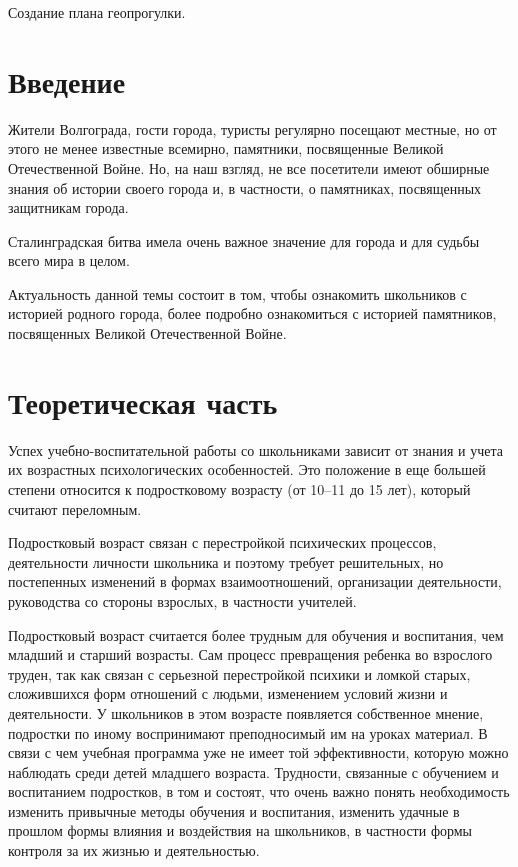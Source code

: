 \newcommand{\eX}{\stepcounter{theX}X\arabic{theX}}

\begin{center}
  \large Создание плана геопрогулки.
\end{center}

\section*{Введение}

Жители Волгограда, гости города, туристы регулярно посещают местные, но от этого
не менее известные всемирно, памятники, посвященные Великой Отечественной Войне.
Но, на наш взгляд, не все посетители имеют обширные знания об истории своего
города и, в частности, о памятниках, посвященных защитникам города.

Сталинградская битва имела очень важное значение для города и для судьбы всего
мира в целом.

Актуальность данной темы состоит в том, чтобы ознакомить школьников с историей
родного города, более подробно ознакомиться с историей памятников, посвященных
Великой Отечественной Войне.

\section*{Теоретическая часть}

Успех учебно-воспитательной работы со школьниками зависит от знания и учета их
возрастных психологических особенностей. Это положение в еще большей степени
относится к подростковому возрасту (от 10--11 до 15 лет), который считают
переломным.

Подростковый возраст связан с перестройкой психических процессов, деятельности
личности школьника и поэтому требует решительных, но постепенных изменений в
формах взаимоотношений, организации деятельности, руководства со стороны
взрослых, в частности учителей.

Подростковый возраст считается более трудным для обучения и воспитания, чем
младший и старший возрасты. Сам процесс превращения ребенка во
взрослого труден, так как связан с серьезной перестройкой психики и ломкой
старых, сложившихся форм отношений с людьми, изменением условий жизни и
деятельности. У школьников в этом возрасте появляется собственное мнение,
подростки по иному воспринимают преподносимый им на уроках материал. В связи с
чем учебная программа уже не имеет той эффективности, которую можно наблюдать
среди детей младшего возраста. Трудности, связанные с обучением и воспитанием
подростков, в том и состоят, что очень важно понять необходимость изменить
привычные методы обучения и воспитания, изменить удачные в прошлом формы
влияния и воздействия на школьников, в частности формы контроля за их жизнью и
деятельностью.

